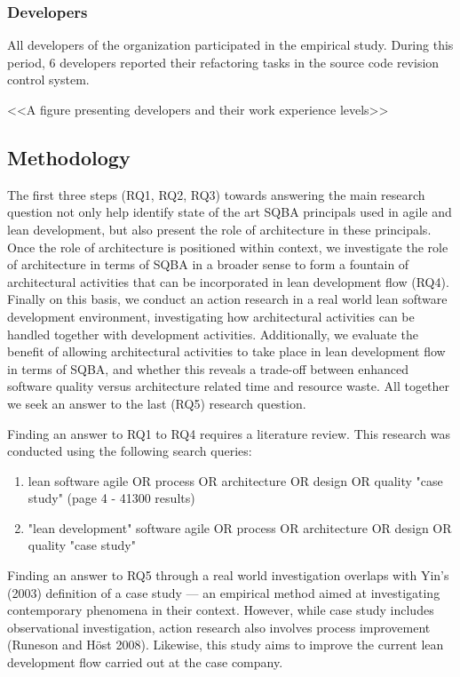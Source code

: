 \documentclass[english,12pt,a4paper,pdftex,sci,utf8]{aaltothesis}
\begin{document}
\subsubsection*{Developers} \label{developers}
All developers of the organization participated in the empirical study. During this period, 6 developers reported their refactoring tasks in the source code revision control system.

<<A figure presenting developers and their work experience levels>>

\subsection{Methodology} \label{methodology}
The first three steps (RQ1, RQ2, RQ3) towards answering the main research question not only help identify state of the art SQBA principals used in agile and lean development, but also present the role of architecture in these principals. Once the role of architecture is positioned within context, we investigate the role of architecture in terms of SQBA in a broader sense to form a fountain of architectural activities that can be incorporated in lean development flow (RQ4). Finally on this basis, we conduct an action research in a real world lean software development environment, investigating how architectural activities can be handled together with development activities. Additionally, we evaluate the benefit of allowing architectural activities to take place in lean development flow in terms of SQBA, and whether this reveals a trade-off between enhanced software quality versus architecture related time and resource waste. All together we seek an answer to the last (RQ5) research question. 

Finding an answer to RQ1 to RQ4 requires a literature review. This research was conducted using the following search queries:
\begin{enumerate}[label=\textbf{Q1\arabic*}]
\item lean software agile OR process OR architecture OR design OR quality "case study" (page 4 - 41300 results)
\item "lean development" software agile OR process OR architecture OR design OR quality "case study"
\end{enumerate}

Finding an answer to RQ5 through a real world investigation overlaps with Yin's (2003) definition of a case study --- an empirical method aimed at investigating contemporary phenomena in their context. However, while case study includes observational investigation, action research also involves process improvement (Runeson and Höst 2008). Likewise, this study aims to improve the current lean development flow carried out at the case company. 
\end{document}
